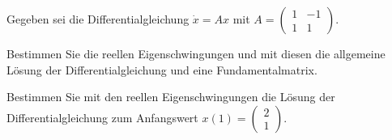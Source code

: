 \begin{Problem}
	Gegeben sei die Differentialgleichung $\dot{x} = Ax$ mit 
	$
	A = \begin{pmatrix}
		1 & -1 \\
		1 & 1
	\end{pmatrix}.
	$	
	\begin{parts}
		\item Bestimmen Sie die reellen Eigenschwingungen und mit diesen die allgemeine Lösung der Differentialgleichung und eine Fundamentalmatrix.
		\item Bestimmen Sie mit den reellen Eigenschwingungen die Lösung der Differentialgleichung zum Anfangswert 
		$
		x(1) = \begin{pmatrix}
			2 \\
			1
		\end{pmatrix}.
		$
	\end{parts}
\end{Problem}
